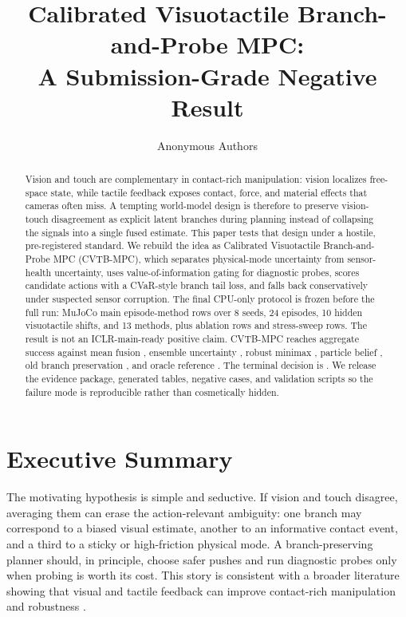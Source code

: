 \documentclass{article}
\title{Calibrated Visuotactile Branch-and-Probe MPC:\\A Submission-Grade Negative Result}
\author{Anonymous Authors}
\newcommand{\method}{\textsc{CVTB-MPC}}
\begin{document}
\maketitle

\begin{abstract}
Vision and touch are complementary in contact-rich manipulation: vision localizes free-space state, while tactile feedback exposes contact, force, and material effects that cameras often miss. A tempting world-model design is therefore to preserve vision-touch disagreement as explicit latent branches during planning instead of collapsing the signals into a single fused estimate. This paper tests that design under a hostile, pre-registered standard. We rebuild the idea as Calibrated Visuotactile Branch-and-Probe MPC (\method{}), which separates physical-mode uncertainty from sensor-health uncertainty, uses value-of-information gating for diagnostic probes, scores candidate actions with a CVaR-style branch tail loss, and falls back conservatively under suspected sensor corruption. The final CPU-only protocol is frozen before the full run: \MainRows{} MuJoCo main episode-method rows over 8 seeds, 24 episodes, 10 hidden visuotactile shifts, and 13 methods, plus \AblationRows{} ablation rows and \StressRows{} stress-sweep rows. The result is not an ICLR-main-ready positive claim. \method{} reaches aggregate success \CVTBAggregateSuccess{} against mean fusion \MeanAggregateSuccess{}, ensemble uncertainty \EnsembleAggregateSuccess{}, robust minimax \RobustAggregateSuccess{}, particle belief \ParticleAggregateSuccess{}, old branch preservation \OldVTAggregateSuccess{}, and oracle reference \OracleAggregateSuccess{}. The terminal decision is \PaperDecision{}. We release the evidence package, generated tables, negative cases, and validation scripts so the failure mode is reproducible rather than cosmetically hidden.
\end{abstract}

\section{Executive Summary}

The motivating hypothesis is simple and seductive. If vision and touch disagree, averaging them can erase the action-relevant ambiguity: one branch may correspond to a biased visual estimate, another to an informative contact event, and a third to a sticky or high-friction physical mode. A branch-preserving planner should, in principle, choose safer pushes and run diagnostic probes only when probing is worth its cost. This story is consistent with a broader literature showing that visual and tactile feedback can improve contact-rich manipulation and robustness \citep{lee2019,lee2019extended,calandra2018,hansen2022,huang2024}.
\end{document}
